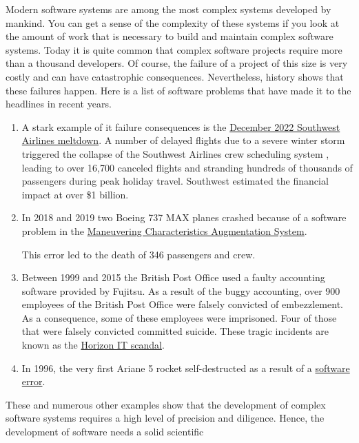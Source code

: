 Modern software systems are among the most complex systems developed by mankind.  You can get a
sense of the complexity of these systems if you look at the amount of work that is necessary to
build and maintain complex software systems.  Today it is quite common that complex software projects require
more than a thousand developers.  Of course, the failure of a project of this size is very costly and can have
catastrophic consequences.  Nevertheless, history shows that these failures happen.
Here is a list of software problems that have made it to the headlines in recent years.
\begin{enumerate}
\item A stark example of \gls{it} failure consequences is the
      \href{https://www.npr.org/2023/01/26/1151667801/southwest-airlines-investigation-losses-holiday-travel-cancellations}{December 2022 Southwest Airlines meltdown}.
      A number of delayed flights due to a severe winter storm triggered the collapse of the Southwest Airlines
      crew scheduling system , leading to over 16,700 
      canceled flights and stranding hundreds of thousands of passengers during peak holiday travel. Southwest
      estimated the financial impact at over \$1 billion. 
\item In 2018 and 2019 two Boeing 737 MAX planes crashed because of a software problem in the
      \href{https://en.wikipedia.org/wiki/Maneuvering_Characteristics_Augmentation_System}{Maneuvering
        Characteristics Augmentation System}.
      
      This error led to the death of 346 passengers and crew.
\item Between 1999 and 2015 the British Post Office used a faulty accounting software provided by Fujitsu.
      As a result of the buggy accounting, over 900 employees of the British Post Office were falsely
      convicted of embezzlement.  As a consequence, some of these employees were imprisoned.  Four of those
      that were falsely convicted committed suicide.  These tragic incidents are known as the
      \href{https://en.wikipedia.org/wiki/British_Post_Office_scandal}{Horizon IT scandal}.     
\item In 1996, the very first Ariane 5 rocket self-destructed as a result of a
      \href{https://www.bugsnag.com/blog/bug-day-ariane-5-disaster/}{software error}. 
\end{enumerate}
These and numerous other examples show that the development of complex software systems requires a high level
of precision and diligence.  Hence, the development of software needs a solid scientific
